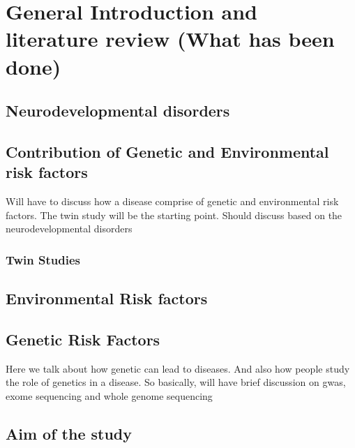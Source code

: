 \chapter{General Introduction and literature review (What has been done)}
\section{Neurodevelopmental disorders}

\section{Contribution of Genetic and Environmental risk factors}
Will have to discuss how a disease comprise of genetic and environmental risk factors.
The twin study will be the starting point.
Should discuss based on the neurodevelopmental disorders
\subsection{Twin Studies}
\section{Environmental Risk factors}

\section{Genetic Risk Factors}
Here we talk about how genetic can lead to diseases.
And also how people study the role of genetics in a disease.
So basically, will have brief discussion on gwas, exome sequencing and whole genome sequencing

\section{Aim of the study}

